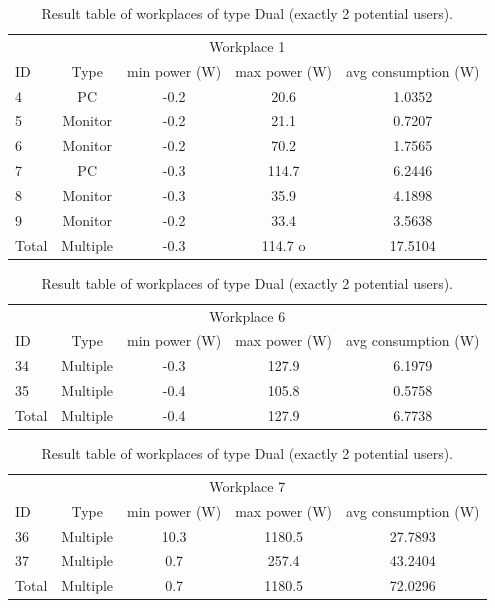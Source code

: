 \begin{table}[h]
	\centering
	\begin{tabular}{l|c|c|c|c}
		\multicolumn{5}{c}{Workplace 1} \\
		ID & Type & min power (W)& max power (W)& avg consumption (W)\\
		4 & PC & -0.2 & 20.6 & 1.0352 \\
		5 & Monitor & -0.2 & 21.1 & 0.7207 \\
		6 & Monitor & -0.2 & 70.2 & 1.7565 \\
		7 & PC & -0.3 & 114.7 & 6.2446 \\
		8 & Monitor & -0.3 & 35.9 & 4.1898 \\
		9 & Monitor & -0.2 & 33.4 & 3.5638 \\
		\hline
		Total & Multiple & -0.3 & 114.7 o& 17.5104
	\end{tabular}
	\begin{tabular}{l|c|c|c|c}
		\multicolumn{5}{c}{Workplace 6} \\
		ID & Type & min power (W)& max power (W)& avg consumption (W)\\
		34 & Multiple & -0.3 & 127.9 & 6.1979 \\
		35 & Multiple & -0.4 & 105.8 & 0.5758 \\
		\hline
		Total & Multiple & -0.4 & 127.9 & 6.7738
	\end{tabular}
	\begin{tabular}{l|c|c|c|c}
		\multicolumn{5}{c}{Workplace 7} \\
		ID & Type & min power (W)& max power (W)& avg consumption (W)\\
		36 & Multiple & 10.3 & 1180.5 & 27.7893 \\
		37 & Multiple & 0.7 & 257.4 & 43.2404 \\
		\hline
		Total & Multiple & 0.7 & 1180.5 & 72.0296
	\end{tabular}
	\caption{Result table of workplaces of type Dual (exactly 2 potential users).}
	\label{tab:dual_workplace}
\end{table}

